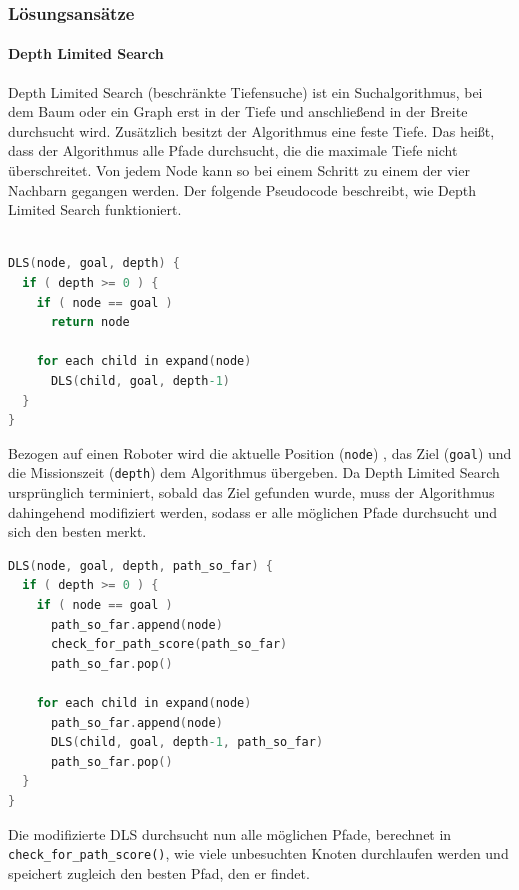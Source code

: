 \documentclass{article}
\begin{document}
\subsubsection{Lösungsansätze}

\paragraph{Depth Limited Search}

Depth Limited Search (beschränkte Tiefensuche) ist ein Suchalgorithmus, 
bei dem Baum oder ein Graph erst in der Tiefe und anschließend in der 
Breite durchsucht wird. Zusätzlich besitzt der Algorithmus eine feste 
Tiefe. Das heißt, dass der Algorithmus alle Pfade durchsucht, die die 
maximale Tiefe nicht überschreitet. Von jedem Node kann so bei einem 
Schritt zu einem der vier Nachbarn gegangen werden. Der folgende Pseudocode
beschreibt, wie Depth Limited Search funktioniert.

\begin{lstlisting}[frame=single, language=C]  % Start your code-block

DLS(node, goal, depth) {
  if ( depth >= 0 ) {
    if ( node == goal )
      return node

    for each child in expand(node)
      DLS(child, goal, depth-1)
  }
}
\end{lstlisting}

Bezogen auf einen Roboter wird die aktuelle Position (\texttt{node}) , das Ziel
(\texttt{goal}) und die Missionszeit (\texttt{depth}) dem Algorithmus übergeben. Da Depth
Limited Search ursprünglich terminiert, sobald das Ziel gefunden wurde, muss der
Algorithmus dahingehend modifiziert werden, sodass er alle möglichen Pfade
durchsucht und sich den besten merkt.

\begin{lstlisting}[frame=single, language=C]
DLS(node, goal, depth, path_so_far) {
  if ( depth >= 0 ) {
    if ( node == goal )
      path_so_far.append(node)
      check_for_path_score(path_so_far)
      path_so_far.pop()

    for each child in expand(node)
      path_so_far.append(node)
      DLS(child, goal, depth-1, path_so_far)
      path_so_far.pop()
  }
}
\end{lstlisting}

Die modifizierte DLS durchsucht nun alle möglichen Pfade,
berechnet in \texttt{check\_for\_path\_score()}, wie viele unbesuchten Knoten durchlaufen
werden und speichert zugleich den besten Pfad, den er findet.
\end{document}

